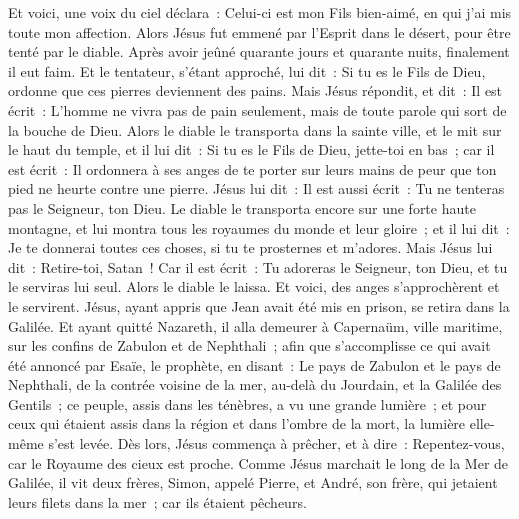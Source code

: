 \begin{multicols}{2}
Et voici, une voix du ciel déclara~: Celui-ci est mon Fils bien-aimé, en qui j'ai mis toute mon affection.
\VerseOne{}Alors Jésus fut emmené par l'Esprit dans le désert, pour être tenté par le diable.
Après avoir jeûné quarante jours et quarante nuits, finalement il eut faim.
Et le tentateur, s'étant approché, lui dit~: Si tu es le Fils de Dieu, ordonne que ces pierres deviennent des pains.
Mais Jésus répondit, et dit~: Il est écrit~: L'homme ne vivra pas de pain seulement, mais de toute parole qui sort de la bouche de Dieu.
Alors le diable le transporta dans la sainte ville, et le mit sur le haut du temple,
et il lui dit~: Si tu es le Fils de Dieu, jette-toi en bas~; car il est écrit~: Il ordonnera à ses anges de te porter sur leurs mains de peur que ton pied ne heurte contre une pierre.
Jésus lui dit~: Il est aussi écrit~: Tu ne tenteras pas le Seigneur, ton Dieu.
Le diable le transporta encore sur une forte haute montagne, et lui montra tous les royaumes du monde et leur gloire~;
et il lui dit~: Je te donnerai toutes ces choses, si tu te prosternes et m'adores.
Mais Jésus lui dit~: Retire-toi, Satan~! Car il est écrit~: Tu adoreras le Seigneur, ton Dieu, et tu le serviras lui seul.
Alors le diable le laissa. Et voici, des anges s'approchèrent et le servirent.
Jésus, ayant appris que Jean avait été mis en prison, se retira dans la Galilée.
Et ayant quitté Nazareth, il alla demeurer à Capernaüm, ville maritime, sur les confins de Zabulon et de Nephthali~;
afin que s'accomplisse ce qui avait été annoncé par Esaïe, le prophète, en disant~:
Le pays de Zabulon et le pays de Nephthali, de la contrée voisine de la mer, au-delà du Jourdain, et la Galilée des Gentils~;
ce peuple, assis dans les ténèbres, a vu une grande lumière~; et pour ceux qui étaient assis dans la région et dans l'ombre de la mort, la lumière elle-même s'est levée.
Dès lors, Jésus commença à prêcher, et à dire~: Repentez-vous, car le Royaume des cieux est proche.
Comme Jésus marchait le long de la Mer de Galilée, il vit deux frères, Simon, appelé Pierre, et André, son frère, qui jetaient leurs filets dans la mer~; car ils étaient pêcheurs.

\end{multicols}
